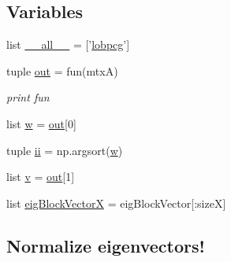 \subsection*{Variables}
\begin{DoxyCompactItemize}
\item 
list \hyperlink{namespacescipy_1_1sparse_1_1linalg_1_1eigen_1_1lobpcg_1_1lobpcg_a43db8aab433fe8e2481626eab919e0a5}{\+\_\+\+\_\+all\+\_\+\+\_\+} = \mbox{[}'\hyperlink{namespacescipy_1_1sparse_1_1linalg_1_1eigen_1_1lobpcg_1_1lobpcg_a07eb016602225854788a18521e1a414f}{lobpcg}'\mbox{]}
\item 
tuple \hyperlink{namespacescipy_1_1sparse_1_1linalg_1_1eigen_1_1lobpcg_1_1lobpcg_a49c3c9d868a61c99986e60bdfbdb6772}{out} = fun(mtx\+A)
\begin{DoxyCompactList}\small\item\em print fun \end{DoxyCompactList}\item 
list \hyperlink{namespacescipy_1_1sparse_1_1linalg_1_1eigen_1_1lobpcg_1_1lobpcg_a86c6a9c1929d10de1f1df41b04d03979}{w} = \hyperlink{namespacescipy_1_1sparse_1_1linalg_1_1eigen_1_1lobpcg_1_1lobpcg_a49c3c9d868a61c99986e60bdfbdb6772}{out}\mbox{[}0\mbox{]}
\item 
tuple \hyperlink{namespacescipy_1_1sparse_1_1linalg_1_1eigen_1_1lobpcg_1_1lobpcg_a2eb7090c79267f136ad92f2113585e44}{ii} = np.\+argsort(\hyperlink{namespacescipy_1_1sparse_1_1linalg_1_1eigen_1_1lobpcg_1_1lobpcg_a86c6a9c1929d10de1f1df41b04d03979}{w})
\item 
list \hyperlink{namespacescipy_1_1sparse_1_1linalg_1_1eigen_1_1lobpcg_1_1lobpcg_a257dfe1f781c7cec50d1e3bb811059fe}{v} = \hyperlink{namespacescipy_1_1sparse_1_1linalg_1_1eigen_1_1lobpcg_1_1lobpcg_a49c3c9d868a61c99986e60bdfbdb6772}{out}\mbox{[}1\mbox{]}
\item 
list \hyperlink{namespacescipy_1_1sparse_1_1linalg_1_1eigen_1_1lobpcg_1_1lobpcg_adfc3268862aad3537c08b6ce4c2385a8}{eig\+Block\+Vector\+X} = eig\+Block\+Vector\mbox{[}\+:size\+X\mbox{]}
\begin{DoxyCompactList}\small\item\em \subsection*{Normalize eigenvectors!}


\end{DoxyCompactList}
\end{DoxyCompactItemize}
